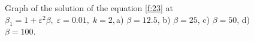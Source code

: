 \documentclass[12pt]{article} %
\newcommand{\eps}{\varepsilon}
\begin{document}
\begin{figure}[h!]
\begin{minipage}[h]{0.49\linewidth}
\end{minipage}
\begin{minipage}[h]{0.49\linewidth}
\end{minipage}
\caption{Graph of the solution of the equation \eqref{f:23} at $\beta_1=1+\eps^2\beta, \;\eps=0.01, \;k=2,$a) $\beta=12.5$, b) $\beta=25$, c) $\beta=50$, d) $\beta=100$.}%
\label{fig:6}
\end{figure}
\end{document}
